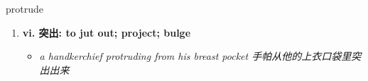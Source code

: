 
\begin{frame}
{\huge protrude}
\begin{center}
\begin{enumerate}\Large
  \item \textbf{vi. 突出: to jut out; project; bulge}
  \begin{itemize}
    \item \em{\Large{a handkerchief protruding from his breast pocket 手帕从他的上衣口袋里突出出来}}
  \end{itemize}
\end{enumerate}
\end{center}
\end{frame}
